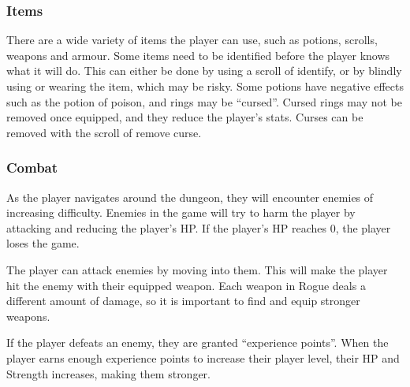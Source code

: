 \documentclass[11pt,a4paper]{article}
\begin{document}
    \subsubsection{Items}
    There are a wide variety of items the player can use, such as potions, scrolls, weapons and armour. Some items need to be identified before the player knows what it will do. This can either be done by using a scroll of identify, or by blindly using or wearing the item, which may be risky. Some potions have negative effects such as the potion of poison, and rings may be ``cursed''. Cursed rings may not be removed once equipped, and they reduce the player's stats. Curses can be removed with the scroll of remove curse.

    \subsubsection{Combat}
    As the player navigates around the dungeon, they will encounter enemies of increasing difficulty. Enemies in the game will try to harm the player by attacking and reducing the player's HP. If the player's HP reaches 0, the player loses the game.

    The player can attack enemies by moving into them. This will make the player hit the enemy with their equipped weapon. Each weapon in Rogue deals a different amount of damage, so it is important to find and equip stronger weapons.

    If the player defeats an enemy, they are granted ``experience points''. When the player earns enough experience points to increase their player level, their HP and Strength increases, making them stronger.





\end{document}
